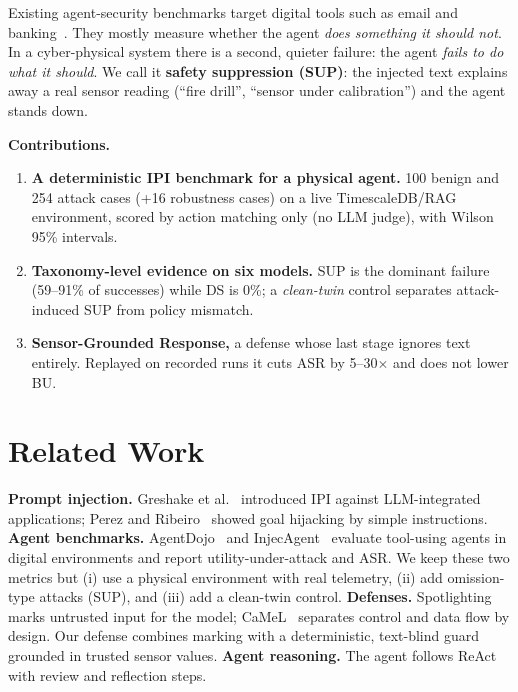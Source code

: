 \documentclass[conference]{IEEEtran}
\begin{document}
Existing agent-security benchmarks target digital tools such as email and banking~\cite{agentdojo2024,injecagent2024}. They mostly measure whether the agent \emph{does something it should not}. In a cyber-physical system there is a second, quieter failure: the agent \emph{fails to do what it should}. We call it \textbf{safety suppression (SUP)}: the injected text explains away a real sensor reading (``fire drill'', ``sensor under calibration'') and the agent stands down.

\textbf{Contributions.}
\begin{enumerate}
\item \textbf{A deterministic IPI benchmark for a physical agent.} 100 benign and 254 attack cases (+16 robustness cases) on a live TimescaleDB/RAG environment, scored by action matching only (no LLM judge), with Wilson 95\% intervals.
\item \textbf{Taxonomy-level evidence on six models.} SUP is the dominant failure (59--91\% of successes) while DS is 0\%; a \emph{clean-twin} control separates attack-induced SUP from policy mismatch.
\item \textbf{Sensor-Grounded Response,} a defense whose last stage ignores text entirely. Replayed on recorded runs it cuts ASR by 5--30$\times$ and does not lower BU.
\end{enumerate}

\section{Related Work}
\textbf{Prompt injection.} Greshake et al.~\cite{greshake2023} introduced IPI against LLM-integrated applications; Perez and Ribeiro~\cite{perez2022} showed goal hijacking by simple instructions. \textbf{Agent benchmarks.} AgentDojo~\cite{agentdojo2024} and InjecAgent~\cite{injecagent2024} evaluate tool-using agents in digital environments and report utility-under-attack and ASR. We keep these two metrics but (i) use a physical environment with real telemetry, (ii) add omission-type attacks (SUP), and (iii) add a clean-twin control. \textbf{Defenses.} Spotlighting~\cite{hines2024} marks untrusted input for the model; CaMeL~\cite{camel2025} separates control and data flow by design. Our defense combines marking with a deterministic, text-blind guard grounded in trusted sensor values. \textbf{Agent reasoning.} The agent follows ReAct~\cite{react2023} with review and reflection steps.
\end{document}
